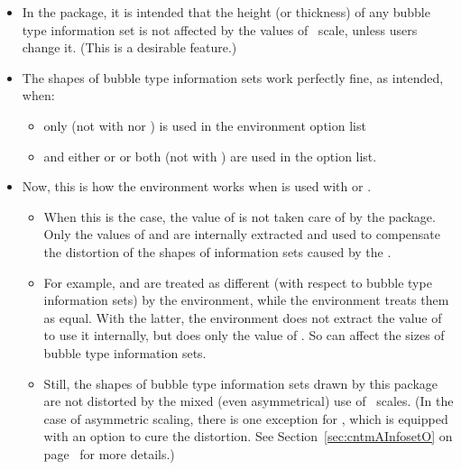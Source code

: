 \begin{itemize}\tightlist
\item 
In the  package, it is intended that the height (or thickness) of any bubble type information set
is not affected by the values of \TikZ\ scale, unless users change it. (This is a desirable feature.)
\item 
The shapes of bubble type information sets work perfectly fine, as intended, when:
  \begin{itemize}
  \item {} only (not with  nor ) is used in the environment option list
  \item and either  or  or both (not with ) are used in the option list.
  \end{itemize}
\item
Now, this is how the  environment works when  is used with  or .
  \begin{itemize}
  \item When this is the case, the value of  is not taken care of by the package. 
  Only the values of  and  are internally extracted and used to compensate the distortion of the shapes of information sets caused by the \emph{}.
  \item For example, \xw{[scale=.5]} and \xw{[scale=.5,xscale=1]} are treated as different (with respect to bubble type information sets) by the  environment, while the  environment treats them as equal. With the latter, the  environment does not extract the value of  to use it internally, but does only the value of . So  can affect the sizes of bubble type information sets.
  \item Still, the shapes of bubble type information sets drawn by this package are not distorted by the mixed (even asymmetrical) use of \TikZ\ scales. (In the case of asymmetric scaling, there is one exception for \cmd{\cntmAInfosetO}, which is equipped with an option to cure the distortion. See Section~\ref{sec:cntmAInfosetO} on page~\pageref{sec:cntmAInfosetO} for more details.)
  \end{itemize}
\end{itemize}

